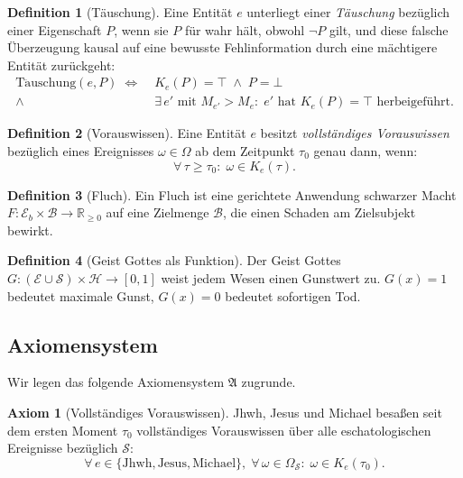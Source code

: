 ﻿\documentclass[a4paper,12pt]{article}
\theoremstyle{definition}
\newtheorem{definition}{Definition}
\newtheorem{axiom}{Axiom}
\begin{document}
\begin{definition}[Täuschung]
  Eine Entität $e$ unterliegt einer \emph{Täuschung} bezüglich einer Eigenschaft
  $P$, wenn sie $P$ für wahr hält, obwohl $\neg P$ gilt, und diese falsche Überzeugung
  kausal auf eine bewusste Fehlinformation durch eine mächtigere Entität zurückgeht:
  \begin{align*}
    \mathrm{T\ddot{a}uschung}(e, P) \;\Leftrightarrow\;
    & K_e(P) = \top \;\wedge\; P = \bot \\
    \wedge\; & \exists\, e' \text{ mit } M_{e'} > M_e:\;
    e' \text{ hat } K_e(P) = \top \text{ herbeigeführt.}
  \end{align*}
\end{definition}

\begin{definition}[Vorauswissen]
  Eine Entität $e$ besitzt \emph{vollständiges Vorauswissen} bezüglich eines Ereignisses
  $\omega \in \Omega$ ab dem Zeitpunkt $\tau_0$ genau dann, wenn:
  \[
    \forall\, \tau \geq \tau_0:\; \omega \in K_e(\tau).
  \]
\end{definition}

\begin{definition}[Fluch]
  Ein Fluch ist eine gerichtete Anwendung schwarzer Macht $F: \mathcal{E}_b \times
  \mathcal{B} \to \mathbb{R}_{\geq 0}$ auf eine Zielmenge $\mathcal{B}$, die einen
  Schaden am Zielsubjekt bewirkt.
\end{definition}

\begin{definition}[Geist Gottes als Funktion]
  Der Geist Gottes $G: (\mathcal{E} \cup \mathcal{S}) \times \mathcal{H} \to [0, 1]$
  weist jedem Wesen einen Gunstwert zu. $G(x) = 1$ bedeutet maximale Gunst,
  $G(x) = 0$ bedeutet sofortigen Tod.
\end{definition}

\subsection{Axiomensystem}

Wir legen das folgende Axiomensystem $\mathfrak{A}$ zugrunde.

\begin{axiom}[Vollständiges Vorauswissen]
\label{ax:vorauswissen}
  Jhwh, Jesus und Michael besaßen seit dem ersten Moment $\tau_0$ vollständiges
  Vorauswissen über alle eschatologischen Ereignisse bezüglich $\mathcal{S}$:
  \[
    \forall\, e \in \{\mathrm{Jhwh}, \mathrm{Jesus}, \mathrm{Michael}\},\;
    \forall\, \omega \in \Omega_{\mathcal{S}}:\;
    \omega \in K_e(\tau_0).
  \]
\end{axiom}
\end{document}
